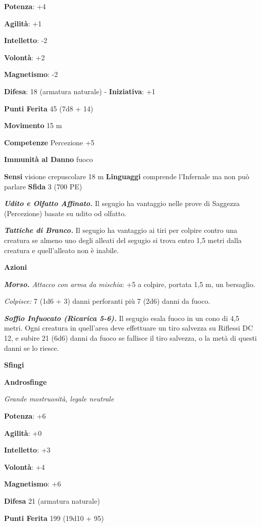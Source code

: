 \begin{multicols}{2}
\textbf{Potenza}: +4

\textbf{Agilità}: +1

\textbf{Intelletto}: -2

\textbf{Volontà}: +2

\textbf{Magnetismo}: -2

\textbf{Difesa}: 18 (armatura naturale) - \textbf{Iniziativa}: +1

\textbf{Punti Ferita} 45 (7d8 + 14)

\textbf{Movimento} 15 m

\textbf{Competenze} Percezione +5

\textbf{Immunità al Danno} fuoco

\textbf{Sensi} visione crepuscolare 18 m
\textbf{Linguaggi} comprende l'Infernale ma non può parlare
\textbf{Sfida} 3 (700 PE)

\emph{\textbf{Udito e Olfatto Affinato.}} Il segugio ha vantaggio nelle
prove di Saggezza (Percezione) basate su udito od olfatto.

\emph{\textbf{Tattiche di Branco.}} Il segugio ha vantaggio ai tiri per
colpire contro una creatura se almeno uno degli alleati del segugio si
trova entro 1,5 metri dalla creatura e quell'alleato non è inabile.

\textbf{Azioni}

\emph{\textbf{Morso.} Attacco con arma da mischia}: +5 a colpire,
portata 1,5 m, un bersaglio.

\emph{Colpisce:} 7 (1d6 + 3) danni perforanti più 7 (2d6) danni da
fuoco.

\emph{\textbf{Soffio Infuocato (Ricarica 5-6).}} Il segugio esala fuoco
in un cono di 4,5 metri. Ogni creatura in quell'area deve effettuare un
tiro salvezza su Riflessi DC 12, e subire 21 (6d6) danni da fuoco se
fallisce il tiro salvezza, o la metà di questi danni se lo riesce.



\textbf{Sfingi}

\textbf{Androsfinge}

\emph{Grande mostruosità, legale neutrale}

\textbf{Potenza}: +6

\textbf{Agilità}: +0

\textbf{Intelletto}: +3

\textbf{Volontà}: +4

\textbf{Magnetismo}: +6

\textbf{Difesa} 21 (armatura naturale)

\textbf{Punti Ferita} 199 (19d10 + 95)


\end{multicols}
